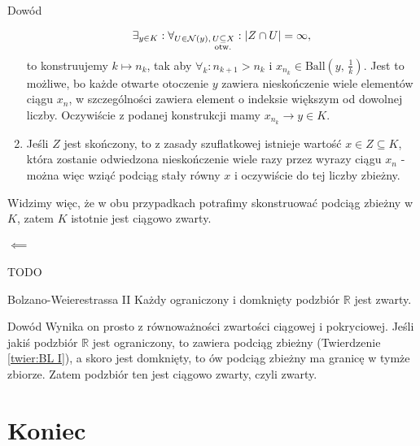 \documentclass{article}
\numberwithin{defi}{section}
\numberwithin{theo}{section}
\numberwithin{defi}{section}
\newcommand{\R}{\mathbb{R}}
\newcommand{\oo}{\infty}
\newcommand{\Nau}{\mathcal{N}}
\newcommand{\subotw}{\underset{\clap{\scriptsize otw.}}{\subseteq}}
\newcommand{\ball}[2]{\text{Ball}(#1, \, #2)}
\begin{document}
\begin{dow}{Dowód}
\begin{enumerate}
\begin{equation*}
                \exists_{y \in K}: \forall_{U \in \Nau(y), \, U \subotw X}: | Z \cap U | = \oo,
            \end{equation*} to konstruujemy $k \mapsto n_k$, tak aby $\forall_k: n_{k+1} > n_k$ i $x_{n_k} \in \ball{y}{\frac{1}{k}}$. Jest to możliwe, bo każde otwarte otoczenie $y$ zawiera nieskończenie wiele elementów ciągu $x_n$, w szczególności zawiera element o indeksie większym od dowolnej liczby. Oczywiście z podanej konstrukcji mamy $x_{n_k} \to y \in K$.
            \item Jeśli $Z$ jest skończony, to z zasady szuflatkowej istnieje wartość $x \in Z \subseteq K$, która zostanie odwiedzona nieskończenie wiele razy przez wyrazy ciągu $x_n$ - można więc wziąć podciąg stały równy $x$ i oczywiście do tej liczby zbieżny.
        \end{enumerate} Widzimy więc, że w obu przypadkach potrafimy skonstruować podciąg zbieżny w $K$, zatem $K$ istotnie jest ciągowo zwarty.
        
        \paragraph{$\impliedby$} TODO
        
    \end{dow}



    \begin{twier}{Bolzano-Weierestrassa II} \label{twier:BL II}
        Każdy ograniczony i domknięty podzbiór $\R$ jest zwarty.
    \end{twier}

    \begin{dow}{Dowód}
        Wynika on prosto z równoważności zwartości ciągowej i pokryciowej. Jeśli jakiś podzbiór $\R$ jest ograniczony, to zawiera podciąg zbieżny (Twierdzenie \ref{twier:BL I}), a skoro jest domknięty, to ów podciąg zbieżny ma granicę w tymże zbiorze. Zatem podzbiór ten jest ciągowo zwarty, czyli zwarty.
    \end{dow}









\section*{Koniec}
\tableofcontents
\end{document}
